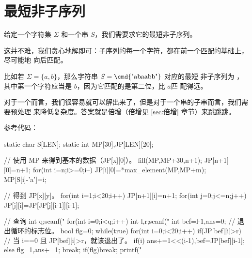 \section{最短非子序列} \label{sec:最短非子序列}
给定一个字符集 $\Sigma$ 和一个串 $S$，我们需要求它的最短非子序列。

这并不难，我们贪心地解即可：子序列的每一个字符，都在前一个匹配的基础上，尽可能地
向后匹配。

比如若 $\Sigma = \{a, b\}$，那么字符串 $S = \text{\cmd{"abaabb"}}$ 对应的最短
非子序列为 ，其中第一个字符应当是 $b$，因为它匹配的是第二位，比 $a$匹
配得远。

对于一个而言，我们很容易就可以解出来了，但是对于一个串的子串而言，我们需要预处理
来降低复杂度。答案就是倍增（倍增见 \ref{sec:倍增} 章节）来跳跳跳。

参考代码：
\begin{Cpp}
static char S[LEN];
static int MP[30],JP[LEN][20];

// 使用 MP 来得到基本的数据（JP[x][0]）。
fill(MP,MP+30,n+1);
JP[n+1][0]=n+1;
for(int i=n;i>=0;i--){
  JP[i][0]=*max_element(MP,MP+m);
  MP[S[i]-'a']=i;
}

// 得到 JP[x][y]。
for(int i=1;i<20;i++){
  JP[n+1][i]=n+1;
  for(int j=0;j<=n;j++){
    JP[j][i]=JP[JP[j][i-1]][i-1];
  }
}

// 查询
int q;scanf("%
for(int i=0;i<q;i++){
  int l,r;scanf("%
  int bef=l-1,ans=0;
  // 退出循环的标志位。
  bool flg=0;
  while(true){
    for(int i=0;i<20;i++){
      if(JP[bef][i]>r) {
        // 当 i==0 且 JP[bef][i]>r，就该退出了。
        if(i) ans+=1<<(i-1),bef=JP[bef][i-1];
        else flg=1,ans+=1; 
        break;
      }
    }
    if(flg)break;
  }
  printf("%
}
\end{Cpp}
